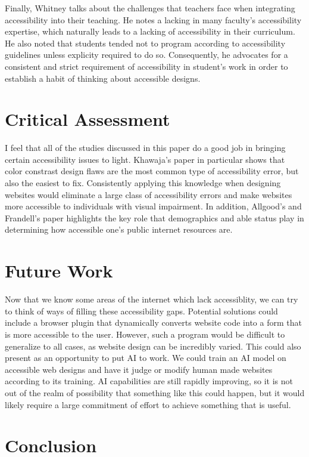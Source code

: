 \documentclass{article}
\begin{document}
Finally, Whitney talks about the challenges that teachers face when integrating accessibility into their teaching.
He notes a lacking in many faculty's accessibility expertise, which naturally leads to a lacking of accessibility in their curriculum.
He also noted that students tended not to program according to accessibility guidelines unless explicity required to do so.
Consequently, he advocates for a consistent and strict requirement of accessibility in student's work in order to establish a habit of thinking about accessible designs.


\section{Critical Assessment}
I feel that all of the studies discussed in this paper do a good job in bringing certain accessibility issues to light.
Khawaja's paper in particular shows that color constrast design flaws are the most common type of accessibility error, but also the easiest to fix.
Consistently applying this knowledge when designing websites would eliminate a large class of accessibility errors and make websites more accessible to individuals with visual impairment.
In addition, Allgood's and Frandell's paper highlights the key role that demographics and able status play in determining how accessible one's public internet resources are.


\section{Future Work}
Now that we know some areas of the internet which lack accessiblity, we can try to think of ways of filling these accessibility gaps.
Potential solutions could include a browser plugin that dynamically converts website code into a form that is more accessible to the user.
However, such a program would be difficult to generalize to all cases, as website design can be incredibly varied.
This could also present as an opportunity to put AI to work.
We could train an AI model on accessible web designs and have it judge or modify human made websites according to its training.
AI capabilities are still rapidly improving, so it is not out of the realm of possibility that something like this could happen, but it would likely require a large commitment of effort to achieve something that is useful.


\section{Conclusion}


\small


\end{document}
